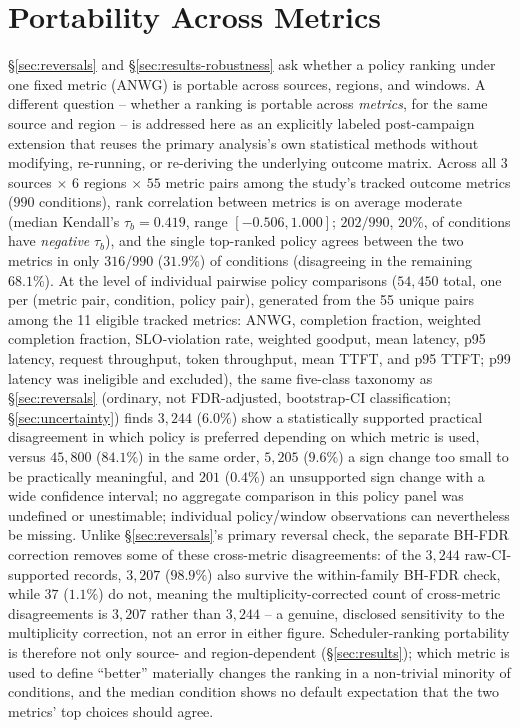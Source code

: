 \section{Portability Across Metrics}
\label{sec:results-cross-metric}

\S\ref{sec:reversals} and \S\ref{sec:results-robustness} ask whether a
policy ranking under one fixed metric (ANWG) is portable across sources,
regions, and windows. A different question -- whether a ranking is
portable across \emph{metrics}, for the same source and region -- is
addressed here as an explicitly labeled post-campaign extension that
reuses the primary analysis's own statistical methods without modifying,
re-running, or re-deriving the underlying outcome matrix. Across all $3$
sources $\times$ $6$ regions $\times$ $55$
metric pairs among the study's tracked outcome metrics ($990$ conditions),
rank correlation between metrics is on average moderate (median Kendall's
$\tau_b = 0.419$, range $[-0.506, 1.000]$; $202/990$, $20\%$, of conditions
have \emph{negative} $\tau_b$), and the single top-ranked policy agrees
between the two metrics in only $316/990$ ($31.9\%$) of conditions
(disagreeing in the remaining $68.1\%$). At the level of individual
pairwise policy comparisons ($54{,}450$ total, one per (metric pair, condition, policy pair), generated from the 55 unique pairs among the 11 eligible tracked metrics: ANWG, completion fraction, weighted completion fraction, SLO-violation rate, weighted goodput, mean latency, p95 latency, request throughput, token throughput, mean TTFT, and p95 TTFT; p99 latency was ineligible and excluded), the same five-class taxonomy as \S\ref{sec:reversals} (ordinary, not
FDR-adjusted, bootstrap-CI classification; \S\ref{sec:uncertainty}) finds $3{,}244$ ($6.0\%$) show a statistically
supported practical disagreement in which
policy is preferred depending on which metric is used, versus $45{,}800$
($84.1\%$) in the same order, $5{,}205$ ($9.6\%$) a sign change too small
to be practically meaningful, and $201$ ($0.4\%$) an unsupported sign
change with a wide confidence interval; no aggregate comparison in this policy panel
was undefined or unestimable; individual policy/window observations can nevertheless be missing. Unlike \S\ref{sec:reversals}'s primary
reversal check, the separate BH-FDR correction removes some of these
cross-metric disagreements: of the $3{,}244$ raw-CI-supported records,
$3{,}207$ ($98.9\%$) also survive the within-family BH-FDR check, while
$37$ ($1.1\%$) do not, meaning the multiplicity-corrected count of
cross-metric disagreements is $3{,}207$ rather than $3{,}244$ -- a genuine,
disclosed sensitivity to the multiplicity correction, not an error in
either figure. Scheduler-ranking portability is
therefore not only source- and region-dependent (\S\ref{sec:results});
which metric is used to define ``better'' materially changes the ranking
in a non-trivial minority of conditions, and the median condition shows no
default expectation that the two metrics' top choices should agree.



